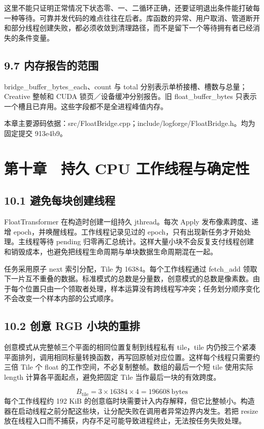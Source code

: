 \documentclass[UTF8,zihao=-4,openany]{ctexbook}
\begin{document}
这里不能只证明正常情况下状态零、一、二循环正确，还要证明退出条件能打破每一种等待。可靠并发代码的难点往往在后者。库函数的异常、用户取消、管道断开和部分线程创建失败，都必须收敛到清理路径，而不是留下一个等待拥有者已经消失的条件变量。


\section*{9.7 内存报告的范围}
bridge\_buffer\_bytes\_each、count 与 total 分别表示单桥接槽、槽数与总量；Creative 整帧和 CUDA 锁页／设备缓冲分别报告。旧 float\_buffer\_bytes 只表示一个槽且已弃用。这些字段都不是全进程峰值内存。


\par\small 本章主要源码依据：src/FloatBridge.cpp；include/logforge/FloatBridge.h。均为固定提交 913e4b9。\normalsize

\chapter*{第十章　持久 CPU 工作线程与确定性}

\section*{10.1 避免每块创建线程}
FloatTransformer 在构造时创建一组持久 jthread。每次 Apply 发布像素跨度、递增 epoch，并唤醒线程。工作线程记录见过的 epoch，只有出现新任务才开始处理。主线程等待 pending 归零再汇总统计。这样大量小块不会反复支付线程创建和销毁成本，也避免把线程生命周期与单块数据生命周期混在一起。

任务采用原子 next 索引分配，Tile 为 16384。每个工作线程通过 fetch\_add 领取下一片互不重叠的数据。标准模式的总数是分量数，创意模式的总数是像素数。由于每个位置只由一个领取者处理，样本运算没有跨线程写冲突；任务划分顺序变化不会改变一个样本内部的公式顺序。


\section*{10.2 创意 RGB 小块的重排}
创意模式从完整帧三个平面的相同位置复制到线程私有 tile，tile 内仍按三个紧凑平面排列，调用相同标量转换函数，再写回原帧对应位置。这样每个线程只需要约三倍 Tile 个 float 的工作空间，不必复制整帧。数组的最后一个短 tile 使用实际 length 计算各平面起点，避免把固定 Tile 当作最后一块的有效跨度。


\begin{equation}
B_{\mathrm{tile}}=3\times16384\times4=196608\ \mathrm{bytes}
\end{equation}
每个工作线程约 192 KiB 的创意临时块需要计入内存解释，但它比整帧小。构造器在启动线程之前分配这些块，让分配失败在调用者异常边界内发生。若把 resize 放在线程入口而不捕获，内存不足可能导致进程终止，无法按任务失败处理。
\end{document}
